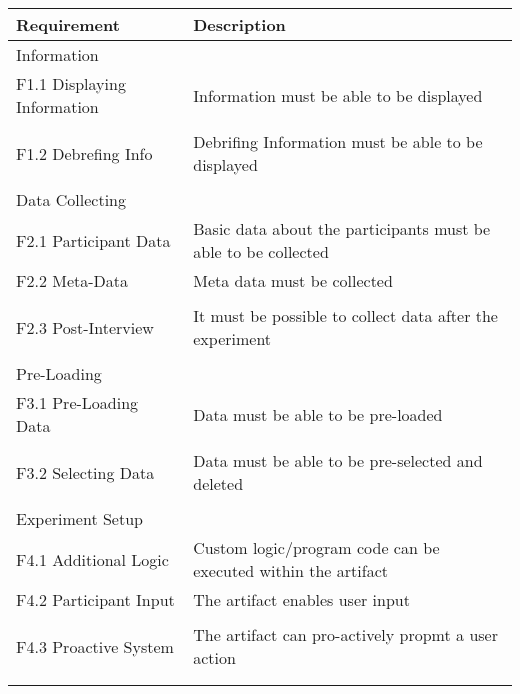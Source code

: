 \begin{table}
    \centering
    \small
    \begin{tabular}{L{0.35\textwidth}L{0.59\textwidth}}
    \hline
    Requirement                     & Description \\ \hline
    Information                 &             \\ \hline
    F1.1 Displaying Information     & Information must be able to be displayed            \\
     & \\
    F1.2 Debrefing Info             & Debrifing Information must be able to be displayed           \\
    & \\ \hline
    Data Collecting             &             \\ \hline
    F2.1 Participant Data           & Basic data about the participants must be able to be collected           \\
    F2.2 Meta-Data                  & Meta data must be collected            \\
    & \\
    F2.3 Post-Interview             & It must be possible to collect data after the experiment            \\
    & \\  \hline
    Pre-Loading                 &             \\ \hline
    F3.1 Pre-Loading Data           & Data must be able to be pre-loaded            \\
    & \\
    F3.2 Selecting Data             & Data must be able to be pre-selected and deleted           \\
    & \\ \hline
    Experiment Setup            &             \\ \hline
    F4.1 Additional Logic           & Custom logic/program code can be executed within the artifact            \\
    F4.2 Participant Input          & The artifact enables user input            \\
    & \\
    F4.3 Proactive System           & The artifact can pro-actively propmt a user action           \\
    & \\ \hline

\end{tabular}
\end{table}
